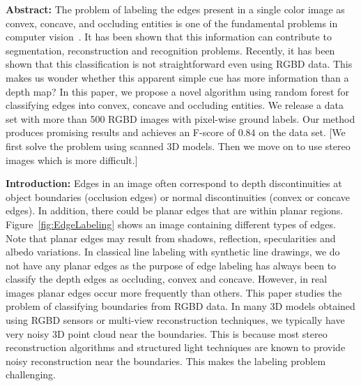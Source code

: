 \noindent
{\bf Abstract:}
The problem of labeling the edges present in a single color image as convex, concave, and occluding 
entities is one of the fundamental problems in computer vision~\cite{mild-sugihara}. It has been shown 
that this information can contribute to segmentation, reconstruction and recognition problems. Recently, 
it has been shown that this classification is not straightforward even using RGBD data. This makes us 
wonder whether this apparent simple cue has more information than a depth map? In this paper, 
we propose a novel algorithm using random forest for classifying edges into convex, concave and 
occluding entities. We release a data set with more than 500 RGBD images with pixel-wise ground 
labels. Our method produces promising results and achieves an F-score of $0.84$ on the data set.
[We first solve the problem using scanned 3D models. Then we move on to use stereo images which is more difficult.]

\noindent
{\bf Introduction:}
Edges in an image often correspond to depth discontinuities at object boundaries (occlusion 
edges) or normal discontinuities (convex or concave edges). In addition, there could be 
planar edges that are within planar regions. Figure~\ref{fig:EdgeLabeling} shows an image 
containing different types of edges. Note that planar edges may result from shadows, reflection, 
specularities and albedo variations. In classical line labeling with synthetic line 
drawings, we do not have any planar edges as the purpose of edge labeling has always been to 
classify the depth edges as occluding, convex and concave. However, in real images planar 
edges occur more frequently than others. This paper studies the problem of classifying boundaries 
from RGBD data. In many 3D models obtained using RGBD sensors or multi-view reconstruction techniques, 
we typically have very noisy 3D point cloud near the boundaries. This is because most stereo 
reconstruction algorithms and structured light techniques are known to provide noisy reconstruction 
near the boundaries. This makes the labeling problem challenging. 

